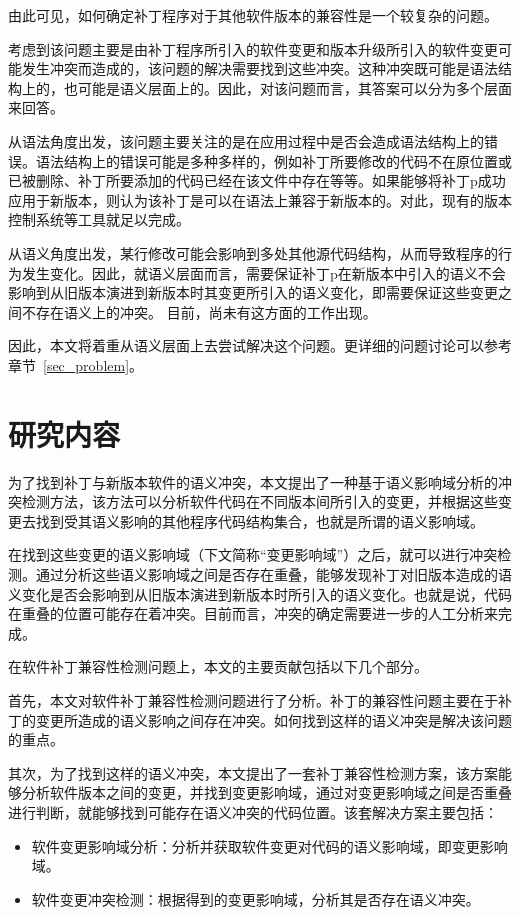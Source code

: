 由此可见，如何确定补丁程序对于其他软件版本的兼容性是一个较复杂的问题。

考虑到该问题主要是由补丁程序所引入的软件变更和版本升级所引入的软件变更可能发生冲突而造成的，该问题的解决需要找到这些冲突。这种冲突既可能是语法结构上的，也可能是语义层面上的。因此，对该问题而言，其答案可以分为多个层面来回答。

从语法角度出发，该问题主要关注的是在应用过程中是否会造成语法结构上的错误。语法结构上的错误可能是多种多样的，例如补丁所要修改的代码不在原位置或已被删除、补丁所要添加的代码已经在该文件中存在等等。如果能够将补丁p成功应用于新版本，则认为该补丁是可以在语法上兼容于新版本的。对此，现有的版本控制系统等工具就足以完成。

从语义角度出发，某行修改可能会影响到多处其他源代码结构，从而导致程序的行为发生变化。因此，就语义层面而言，需要保证补丁p在新版本中引入的语义不会影响到从旧版本演进到新版本时其变更所引入的语义变化，即需要保证这些变更之间不存在语义上的冲突。
目前，尚未有这方面的工作出现。

因此，本文将着重从语义层面上去尝试解决这个问题。更详细的问题讨论可以参考章节~\ref{sec_problem}。


\section{研究内容}

为了找到补丁与新版本软件的语义冲突，本文提出了一种基于语义影响域分析的冲突检测方法，该方法可以分析软件代码在不同版本间所引入的变更，并根据这些变更去找到受其语义影响的其他程序代码结构集合，也就是所谓的语义影响域。

在找到这些变更的语义影响域（下文简称“变更影响域”）之后，就可以进行冲突检测。通过分析这些语义影响域之间是否存在重叠，能够发现补丁对旧版本造成的语义变化是否会影响到从旧版本演进到新版本时所引入的语义变化。也就是说，代码在重叠的位置可能存在着冲突。目前而言，冲突的确定需要进一步的人工分析来完成。

在软件补丁兼容性检测问题上，本文的主要贡献包括以下几个部分。

首先，本文对软件补丁兼容性检测问题进行了分析。补丁的兼容性问题主要在于补丁的变更所造成的语义影响之间存在冲突。如何找到这样的语义冲突是解决该问题的重点。

其次，为了找到这样的语义冲突，本文提出了一套补丁兼容性检测方案，该方案能够分析软件版本之间的变更，并找到变更影响域，通过对变更影响域之间是否重叠进行判断，就能够找到可能存在语义冲突的代码位置。该套解决方案主要包括：
	\begin{itemize}
		\item 软件变更影响域分析：分析并获取软件变更对代码的语义影响域，即变更影响域。
		\item 软件变更冲突检测：根据得到的变更影响域，分析其是否存在语义冲突。
	\end{itemize}
	
